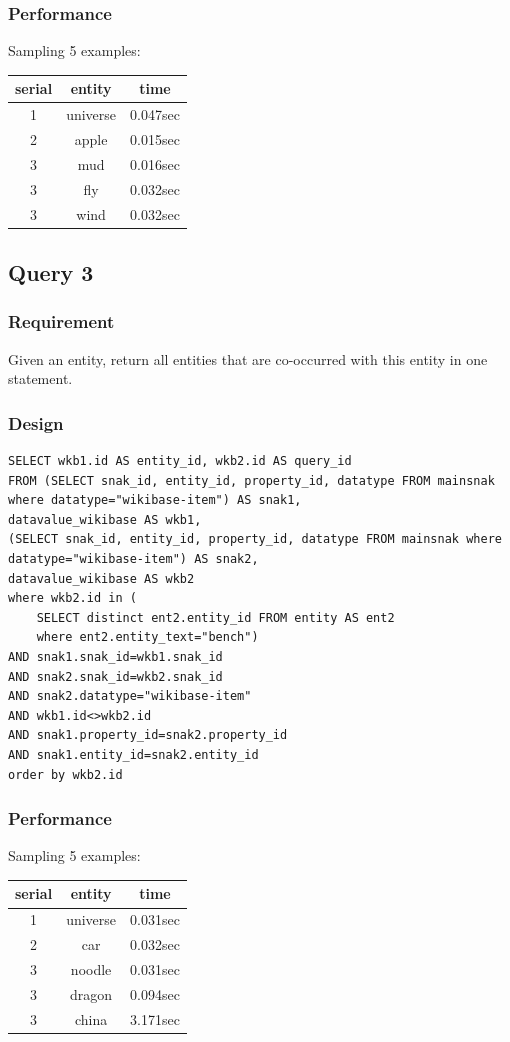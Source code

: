 \documentclass[12pt]{article}
\begin{document}
\subsubsection{Performance}
Sampling 5 examples:
\begin{center}
  \begin{tabular}{ | c | c | c |}
    \hline
    serial & entity & time \\ \hline\hline
    1 & universe & 0.047sec \\ \hline
    2 & apple & 0.015sec \\ \hline
    3 & mud & 0.016sec \\ \hline
    3 & fly & 0.032sec \\ \hline
    3 & wind & 0.032sec \\
    \hline
  \end{tabular}
\end{center}
\subsection{Query 3}
\subsubsection{Requirement}
Given an entity, return all entities that are co-occurred with this entity in one statement.
\subsubsection{Design}
\lstset{language=SQL}
\begin{lstlisting}
SELECT wkb1.id AS entity_id, wkb2.id AS query_id
FROM (SELECT snak_id, entity_id, property_id, datatype FROM mainsnak where datatype="wikibase-item") AS snak1, 
datavalue_wikibase AS wkb1,   
(SELECT snak_id, entity_id, property_id, datatype FROM mainsnak where datatype="wikibase-item") AS snak2, 
datavalue_wikibase AS wkb2
where wkb2.id in (   
	SELECT distinct ent2.entity_id FROM entity AS ent2   
    where ent2.entity_text="bench")   
AND snak1.snak_id=wkb1.snak_id  
AND snak2.snak_id=wkb2.snak_id  
AND snak2.datatype="wikibase-item"   
AND wkb1.id<>wkb2.id   
AND snak1.property_id=snak2.property_id  
AND snak1.entity_id=snak2.entity_id
order by wkb2.id

\end{lstlisting}
\subsubsection{Performance}
Sampling 5 examples:
\begin{center}
  \begin{tabular}{ | c | c | c |}
    \hline
    serial & entity & time \\ \hline\hline
    1 & universe & 0.031sec \\ \hline
    2 & car & 0.032sec \\ \hline
    3 & noodle & 0.031sec \\ \hline
    3 & dragon & 0.094sec \\ \hline
    3 & china & 3.171sec \\
    \hline
  \end{tabular}
\end{center}
\end{document}
